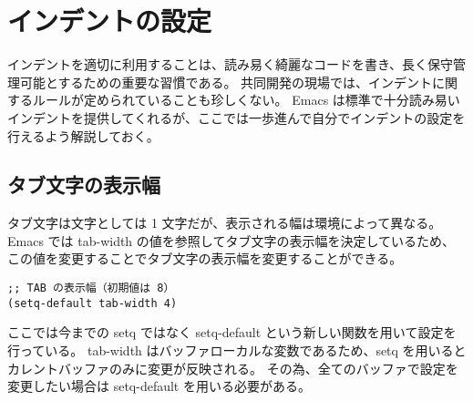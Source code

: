 \section{インデントの設定}
インデントを適切に利用することは、読み易く綺麗なコードを書き、長く保守管理可能とするための重要な習慣である。
共同開発の現場では、インデントに関するルールが定められていることも珍しくない。
Emacs は標準で十分読み易いインデントを提供してくれるが、ここでは一歩進んで自分でインデントの設定を行えるよう解説しておく。
\subsection{タブ文字の表示幅}
タブ文字は文字としては 1 文字だが、表示される幅は環境によって異なる。
Emacs では tab-width の値を参照してタブ文字の表示幅を決定しているため、この値を変更することでタブ文字の表示幅を変更することができる。
\begin{mdframed}[roundcorner=0.50zw,leftmargin=3.00zw,rightmargin=3.00zw,skipabove=0.40zw,skipbelow=0.40zw,innertopmargin=4.00pt,innerbottommargin=4.00pt,innerleftmargin=5.00pt,innerrightmargin=5.00pt,linecolor=gray!020,linewidth=0.50pt,backgroundcolor=gray!20]
\begin{verbatim}
;; TAB の表示幅（初期値は 8）
(setq-default tab-width 4)
\end{verbatim}
\end{mdframed}
ここでは今までの setq ではなく setq-default という新しい関数を用いて設定を行っている。
tab-width はバッファローカルな変数であるため、setq を用いるとカレントバッファのみに変更が反映される。
その為、全てのバッファで設定を変更したい場合は setq-default を用いる必要がある。

